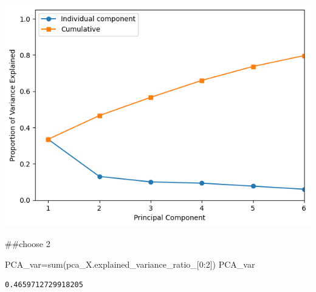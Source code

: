 \documentclass[
  11pt,
  letterpaper,
  DIV=11,
  numbers=noendperiod]{scrartcl}
\newenvironment{Shaded}{\begin{snugshade}}{\end{snugshade}}
\newcommand{\BuiltInTok}[1]{\textcolor[rgb]{0.00,0.23,0.31}{#1}}
\newcommand{\CommentTok}[1]{\textcolor[rgb]{0.37,0.37,0.37}{#1}}
\newcommand{\DecValTok}[1]{\textcolor[rgb]{0.68,0.00,0.00}{#1}}
\newcommand{\NormalTok}[1]{\textcolor[rgb]{0.00,0.23,0.31}{#1}}
\newcommand{\OperatorTok}[1]{\textcolor[rgb]{0.37,0.37,0.37}{#1}}
\begin{document}
\includegraphics{assignment6111_files/figure-pdf/cell-35-output-1.png}

\begin{Shaded}
\begin{Highlighting}[]
\CommentTok{\#\#choose 2}

\NormalTok{PCA\_var}\OperatorTok{=}\BuiltInTok{sum}\NormalTok{(pca\_X.explained\_variance\_ratio\_[}\DecValTok{0}\NormalTok{:}\DecValTok{2}\NormalTok{])}
\NormalTok{PCA\_var}
\end{Highlighting}
\end{Shaded}

\begin{verbatim}
0.4659712729918205
\end{verbatim}
\end{document}
